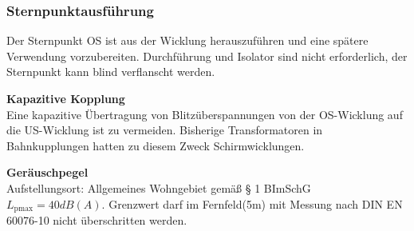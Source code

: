 \subsubsection*{Sternpunktausführung}
Der Sternpunkt OS ist aus der Wicklung herauszuführen und eine spätere Verwendung vorzubereiten. Durchführung und Isolator sind nicht erforderlich, der Sternpunkt kann blind verflanscht werden. 

\textbf{Kapazitive Kopplung}\\
Eine kapazitive Übertragung von Blitzüberspannungen von der OS-Wicklung auf die US-Wicklung ist zu vermeiden. Bisherige Transformatoren in Bahnkupplungen hatten zu diesem Zweck Schirmwicklungen. 
 
\textbf{Geräuschpegel}\\
Aufstellungsort: Allgemeines Wohngebiet gemäß § 1 BImSchG  $L_\mathrm{pmax}=40 dB(A)$.
Grenzwert darf im Fernfeld(5m) mit Messung nach DIN EN 60076-10 nicht überschritten werden.
